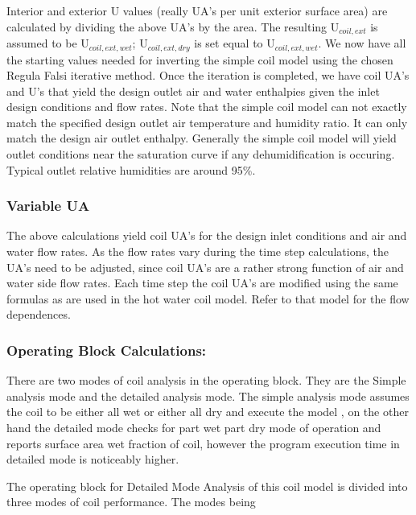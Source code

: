 Interior and exterior U values (really UA's per unit exterior surface area) are calculated by dividing the above UA's by the area. The resulting U\(_{coil,ext}\) is assumed to be U\(_{coil,ext,wet}\); U\(_{coil,ext,dry}\) is set equal to U\(_{coil,ext,wet}\). We now have all the starting values needed for inverting the simple coil model using the chosen Regula Falsi iterative method. Once the iteration is completed, we have coil UA's and U's that yield the design outlet air and water enthalpies given the inlet design conditions and flow rates. Note that the simple coil model can not exactly match the specified design outlet air temperature and humidity ratio. It can only match the design air outlet enthalpy. Generally the simple coil model will yield outlet conditions near the saturation curve if any dehumidification is occuring. Typical outlet relative humidities are around 95\%.

\subsubsection{Variable UA}\label{variable-ua}

The above calculations yield coil UA's for the design inlet conditions and air and water flow rates. As the flow rates vary during the time step calculations, the UA's need to be adjusted, since coil UA's are a rather strong function of air and water side flow rates. Each time step the coil UA's are modified using the same formulas as are used in the hot water coil model. Refer to that model for the flow dependences.

\subsubsection{Operating Block Calculations:}\label{operating-block-calculations}

There are two modes of coil analysis in the operating block. They are the Simple analysis mode and the detailed analysis mode. The simple analysis mode assumes the coil to be either all wet or either all dry and execute the model , on the other hand the detailed mode checks for part wet part dry mode of operation and reports surface area wet fraction of coil, however the program execution time in detailed mode is noticeably higher.

The operating block for Detailed Mode Analysis of this coil model is divided into three modes of coil performance. The modes being

